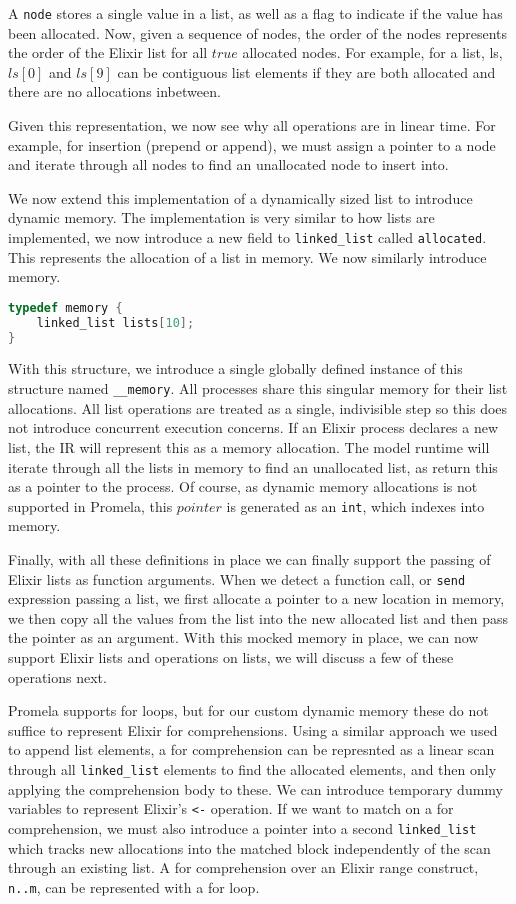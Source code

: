 A \texttt{node} stores a single value in a list, as well as a flag to indicate if the value has been allocated. Now, given a sequence of nodes, the order of the nodes represents the order of the Elixir list for all $true$ allocated nodes. For example, for a list, ls, $ls[0]$ and $ls[9]$ can be contiguous list elements if they are both allocated and there are no allocations inbetween.
\par
Given this representation, we now see why all operations are in linear time. For example, for insertion (prepend or append), we must assign a pointer to a node and iterate through all nodes to find an unallocated node to insert into.
\par
We now extend this implementation of a dynamically sized list to introduce dynamic memory. The implementation is very similar to how lists are implemented, we now introduce a new field to \texttt{linked\_list} called \texttt{allocated}. This represents the allocation of a list in memory. We now similarly introduce memory.
\begin{lstlisting}[language=C, xleftmargin=.1\linewidth, caption={Memory intermediate representation.}]
typedef memory {
    linked_list lists[10];
}
\end{lstlisting}
With this structure, we introduce a single globally defined instance of this structure named \texttt{\_\_memory}. All processes share this singular memory for their list allocations. All list operations are treated as a single, indivisible step so this does not introduce concurrent execution concerns. If an Elixir process declares a new list, the IR will represent this as a memory allocation. The model runtime will iterate through all the lists in memory to find an unallocated list, as return this as a pointer to the process. Of course, as dynamic memory allocations is not supported in Promela, this $pointer$ is generated as an \texttt{int}, which indexes into memory. 
\par
Finally, with all these definitions in place we can finally support the passing of Elixir lists as function arguments. When we detect a function call, or \texttt{send} expression passing a list, we first allocate a pointer to a new location in memory, we then copy all the values from the list into the new allocated list and then pass the pointer as an argument. With this mocked memory in place, we can now support Elixir lists and operations on lists, we will discuss a few of these operations next.
\par
Promela supports for loops, but for our custom dynamic memory these do not suffice to represent Elixir for comprehensions. Using a similar approach we used to append list elements, a for comprehension can be represnted as a linear scan through all \texttt{linked\_list} elements to find the allocated elements, and then only applying the comprehension body to these. We can introduce temporary dummy variables to represent Elixir's \texttt{<-} operation. If we want to match on a for comprehension, we must also introduce a pointer into a second \texttt{linked\_list} which tracks new allocations into the matched block independently of the scan through an existing list. A for comprehension over an Elixir range construct, \texttt{n..m}, can be represented with a for loop.

